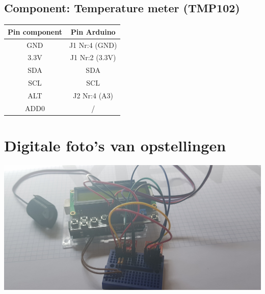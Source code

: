 \documentclass[a4paper]{report}
\begin{document}
\subsection{Component: Temperature meter (TMP102)}
\begin{tabular}{|c|c|}
    \hline
    Pin component & Pin Arduino\\
    \hline
    GND  & J1 Nr:4  (GND)\\
    3.3V & J1 Nr:2  (3.3V)\\
    SDA  & SDA\\
    SCL  & SCL\\
    ALT  & J2 Nr:4  (A3)\\
    ADD0 & /\\
    \hline
\end{tabular}

\section{Digitale foto’s van opstellingen}
\includegraphics[width=\textwidth]{Fysieke_Voorstelling1}\\
\end{document}
